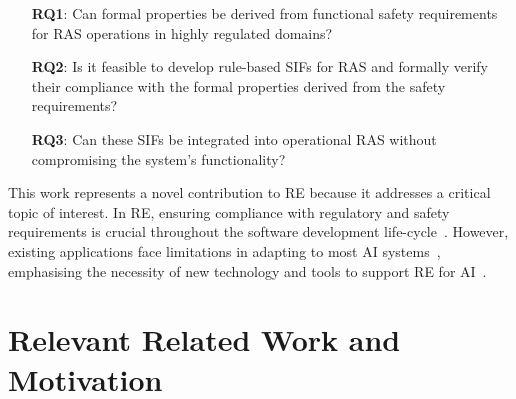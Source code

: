 \documentclass[conference]{IEEEtran}
\newcommand{\marienote}[1]{\todo[color=orange!65,inline]{Marie: #1}}
\begin{document}
\begin{enumerate}
\item [\textbf{RQ1}:] Can formal properties be derived from functional safety requirements for RAS operations in highly regulated domains?
\item [\textbf{RQ2}:] Is it feasible to develop rule-based SIFs for RAS and formally verify their compliance with the formal properties derived from the safety requirements?
\item [\textbf{RQ3}:] Can these SIFs be integrated into operational RAS without compromising the system's functionality?
\end{enumerate}


This work represents a novel contribution to RE because it addresses a critical topic of interest. In RE, ensuring compliance with regulatory and safety requirements is crucial throughout the software development life-cycle~\cite{RERegulatoryCompliance}. However, existing applications face limitations in adapting to most AI systems~\cite{REChallenges}, emphasising the necessity of new technology and tools to support RE for AI~\cite{RE4AI}.


\section{Relevant Related Work and Motivation}
\end{document}
